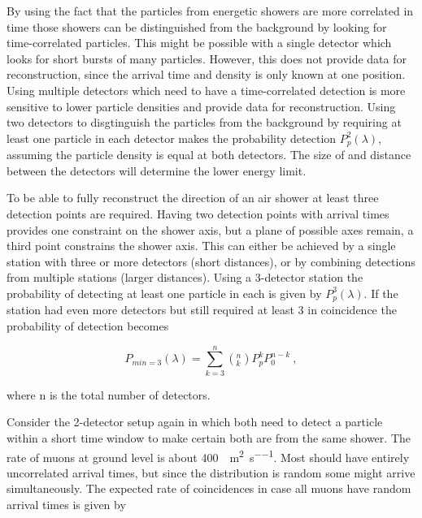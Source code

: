 By using the fact that the particles from energetic showers are more correlated in time those showers can be distinguished from the background by looking for time-correlated particles. This might be possible with a single detector which looks for short bursts of many particles. However, this does not provide data for reconstruction, since the arrival time and density is only known at one position. Using multiple detectors which need to have a time-correlated detection is more sensitive to lower particle densities and provide data for reconstruction. Using two detectors to disgtinguish the particles from the background by requiring at least one particle in each detector makes the probability detection $P_p^2(\lambda)$, assuming the particle density is equal at both detectors. The size of and distance between the detectors will determine the lower energy limit.

To be able to fully reconstruct the direction of an air shower at least three detection points are required. Having two detection points with arrival times provides one constraint on the shower axis, but a plane of possible axes remain, a third point constrains the shower axis. This can either be achieved by a single station with three or more detectors (short distances), or by combining detections from multiple stations (larger distances). Using a 3-detector station the probability of detecting at least one particle in each is given by $P_p^3(\lambda)$. If the station had even more detectors but still required at least 3 in coincidence the probability of detection becomes

\begin{equation}
    P_{min=3}(\lambda) = \sum_{k=3}^{n} \left(^n_k\right) P_p^k P_0^{n-k} \ ,
\end{equation}

where n is the total number of detectors.

Consider the 2-detector setup again in which both need to detect a particle within a short time window to make certain both are from the same shower. The rate of muons at ground level is about \SI{400}{\Pmump\per\meter\squared\per\second}. Most should have entirely uncorrelated arrival times, but since the distribution is random some might arrive simultaneously. The expected rate of coincidences in case all muons have random arrival times is given by


